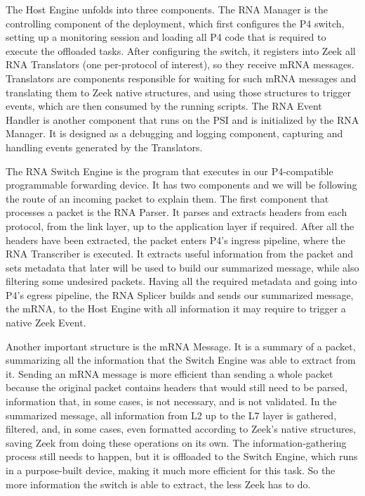 The Host Engine unfolds into three components. The RNA Manager is the controlling component of the deployment, which first configures the P4 switch, setting up a monitoring session and loading all P4 code that is required to execute the offloaded tasks. After configuring the switch, it registers into Zeek all RNA Translators (one per-protocol of interest), so they receive mRNA messages. Translators are components responsible for waiting for such mRNA messages and translating them to Zeek native structures, and using those structures to trigger events, which are then consumed by the running scripts. The RNA Event Handler is another component that runs on the PSI and is initialized by the RNA Manager. It is designed as a debugging and logging component, capturing and handling events generated by the Translators.

The RNA Switch Engine is the program that executes in our P4-compatible programmable forwarding device. It has two components and we will be following the route of an incoming packet to explain them. The first component that processes a packet is the RNA Parser. It parses and extracts headers from each protocol, from the link layer, up to the application layer if required. After all the headers have been extracted, the packet enters P4's ingress pipeline, where the RNA Transcriber is executed. It extracts useful information from the packet and sets metadata that later will be used to build our summarized message, while also filtering some undesired packets. Having all the required metadata and going into P4's egress pipeline, the RNA Splicer builds and sends our summarized message, the mRNA, to the Host Engine with all information it may require to trigger a native Zeek Event.

Another important structure is the mRNA Message. It is a summary of a packet, summarizing all the information that the Switch Engine was able to extract from it. Sending an mRNA message is more efficient than sending a whole packet because the original packet contains headers that would still need to be parsed, information that, in some cases, is not necessary, and is not validated. In the summarized message, all information from L2 up to the L7 layer is gathered, filtered, and, in some cases, even formatted according to Zeek's native structures, saving Zeek from doing these operations on its own. The information-gathering process still needs to happen, but it is offloaded to the Switch Engine, which runs in a purpose-built device, making it much more efficient for this task. So the more information the switch is able to extract, the less Zeek has to do.

